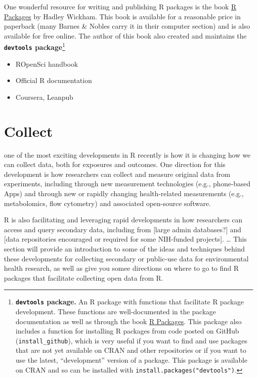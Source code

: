 \documentclass[]{tufte-book}
\providecommand{\tightlist}{%
  \setlength{\itemsep}{0pt}\setlength{\parskip}{0pt}}
\begin{document}
One wonderful resource for writing and publishing R packages is the book \href{http://r-pkgs.had.co.nz/}{R
Packages} by Hadley Wickham. This book is available
for a reasonable price in paperback (many Barnes \& Nobles carry it in their
computer section) and is also available for free online. The author of this book
also created and maintains the \textbf{\texttt{devtools} package}\footnote{\textbf{\texttt{devtools} package.}
  An R package with functions that facilitate R package development. These
  functions are well-documented in the package documentation as well as through
  the book \href{http://r-pkgs.had.co.nz/}{R Packages}. This package also includes a
  function for installing R packages from code posted on GitHub
  (\texttt{install\_github}), which is very useful if you want to find and use packages
  that are not yet available on CRAN and other repositories or if you want to use
  the latest, ``development'' version of a package. This package is available on
  CRAN and so can be installed with \texttt{install.packages("devtools")}.}

\begin{itemize}
\tightlist
\item
  ROpenSci handbook
\item
  Official R documentation
\item
  Coursera, Leanpub
\end{itemize}

\hypertarget{collect}{%
\chapter{Collect}\label{collect}}

 one of the most exciting
developments in R recently is how it is changing how we can collect data, both for
exposures and outcomes. One direction for this development is how researchers can
collect and measure original data from experiments, including through new measurement
technologies (e.g., phone-based Apps) and through new or rapidly changing health-related
measurements (e.g., metabolomics, flow cytometry) and associated open-source
software.

R is also facilitating and leveraging rapid developments in how researchers can access and
query secondary data, including from {[}large admin databases?{]} and {[}data repositories
encouraged or required for some NIH-funded projects{]}. \ldots{} This section will provide an
introduction to some of the ideas and techniques behind these developments for
collecting secondary or public-use data for environmental health research, as well as
give you somee directions on where to go to find R packages that facilitate collecting
open data from R.
\end{document}
